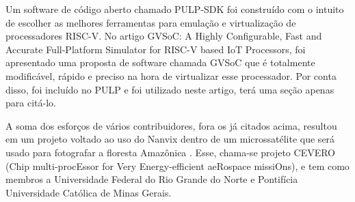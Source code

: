 Um software de código aberto chamado PULP-SDK foi construído com o intuito de escolher as melhores ferramentas para emulação e virtualização de processadores RISC-V. 
No artigo {GVSoC: A Highly Configurable, Fast and Accurate Full-Platform Simulator for RISC-V based IoT Processors}, foi apresentado uma proposta de software chamada
GVSoC que é totalmente modificável, rápido e preciso na hora de virtualizar esse processador. Por conta disso, foi incluído no PULP e foi utilizado neste artigo, terá
uma seção apenas para citá-lo.

A soma dos esforços de vários contribuidores, fora os já citados acima, resultou em um projeto voltado ao uso do Nanvix dentro de um microssatélite que será usado 
para fotografar a floresta Amazônica \cite{RepoCervero}. Esse, chama-se projeto CEVERO (Chip multi-procEssor for Very Energy-efficient aeRospace missiOns), e tem 
como membros a Universidade Federal do Rio Grande do Norte e Pontifícia Universidade Católica de Minas Gerais. 